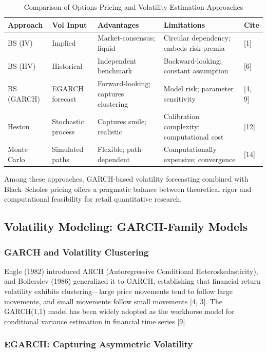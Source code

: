 \documentclass[12pt,a4paper]{article}
\begin{document}
\begin{table}[H]
\centering
\caption{Comparison of Options Pricing and Volatility Estimation Approaches}
\label{tab:pricing_approaches}
\small
\begin{tabularx}{\textwidth}{l l X X l}
\toprule
\textbf{Approach} & \textbf{Vol Input} & \textbf{Advantages} & \textbf{Limitations} & \textbf{Cite} \\
\midrule
BS (IV) & Implied & Market-consensus; liquid & Circular dependency; embeds risk premia & [1] \\
BS (HV) & Historical & Independent benchmark & Backward-looking; constant assumption & [6] \\
BS (GARCH) & EGARCH forecast & Forward-looking; captures clustering & Model risk; parameter sensitivity & [4, 9] \\
Heston & Stochastic process & Captures smile; realistic & Calibration complexity; computational cost & [12] \\
Monte Carlo & Simulated paths & Flexible; path-dependent & Computationally expensive; convergence & [14] \\
\bottomrule
\end{tabularx}
\end{table}

Among these approaches, GARCH-based volatility forecasting combined with Black--Scholes pricing offers a pragmatic balance between theoretical rigor and computational feasibility for retail quantitative research.

\subsection{Volatility Modeling: GARCH-Family Models}

\subsubsection{GARCH and Volatility Clustering}

Engle (1982) introduced ARCH (Autoregressive Conditional Heteroskedasticity), and Bollerslev (1986) generalized it to GARCH, establishing that financial return volatility exhibits clustering---large price movements tend to follow large movements, and small movements follow small movements [4, 3]. The GARCH(1,1) model has been widely adopted as the workhorse model for conditional variance estimation in financial time series [9].

\subsubsection{EGARCH: Capturing Asymmetric Volatility}
\end{document}
